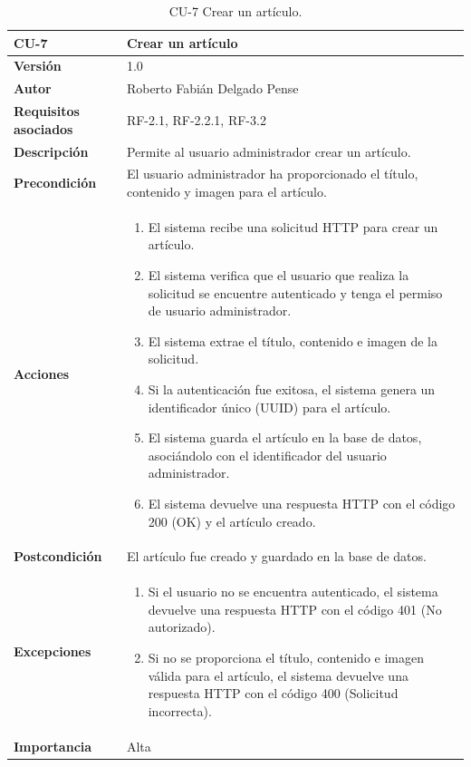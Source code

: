 \begin{table}[p]
	\centering
	\begin{tabularx}{\linewidth}{ p{} p{} }
		\toprule
		\textbf{CU-7}    & \textbf{Crear un artículo}\\
		\toprule
		\textbf{Versión}              & 1.0    \\
		\textbf{Autor}                & Roberto Fabián Delgado Pense \\
		\textbf{Requisitos asociados} & RF-2.1, RF-2.2.1, RF-3.2 \\ 
		\textbf{Descripción}          & Permite al usuario administrador crear un artículo. \\
		\textbf{Precondición}         & El usuario administrador ha proporcionado el título, contenido  y imagen para el artículo.\\
		\textbf{Acciones}             &
		\begin{enumerate}
			\def\labelenumi{\arabic{enumi}.}
			\tightlist
			\item El sistema recibe una solicitud HTTP para crear un artículo.
                \item El sistema verifica que el usuario que realiza la solicitud se encuentre autenticado y tenga el permiso de usuario administrador.
			\item El sistema extrae el título, contenido e imagen de la solicitud.
                \item Si la autenticación fue exitosa, el sistema genera un identificador único (UUID) para el artículo.
                \item El sistema guarda el artículo en la base de datos, asociándolo con el identificador del usuario         administrador.
                \item El sistema devuelve una respuesta HTTP con el código 200 (OK) y el artículo creado.            \end{enumerate}\\
		\textbf{Postcondición}        & El artículo fue creado y guardado en la base de datos.\\
		\textbf{Excepciones}          & 
            \begin{enumerate}
			\def\labelenumi{\arabic{enumi}.}
			\tightlist
			\item Si el usuario no se encuentra autenticado, el sistema devuelve una respuesta HTTP con el código            401 (No autorizado).
			\item Si no se proporciona el título, contenido e imagen válida para el artículo, el sistema devuelve una respuesta HTTP con el código 400 (Solicitud incorrecta).
            \end{enumerate}\\
		\textbf{Importancia}          & Alta \\
		\bottomrule
	\end{tabularx}
	\caption{CU-7 Crear un artículo.}
\end{table}

